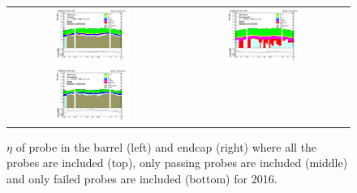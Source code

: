 \begin{figure}[htp]
  \begin{center}
    \begin{tabular}{cc}
      \includegraphics[width=0.45\textwidth]{figures/Zprime/2016/ScaleFactor/SameSign/nominal/stack_eta_BE_Barrel+Endcap_probes_PUW.png} &
      \includegraphics[width=0.45\textwidth]{figures/Zprime/2016/ScaleFactor/SameSign/nominal/stack_eta_BE_Barrel+Endcap_pass_PUW.png} \\
      \includegraphics[width=0.45\textwidth]{figures/Zprime/2016/ScaleFactor/SameSign/nominal/stack_eta_BE_Barrel+Endcap_fail_PUW.png} &
    \end{tabular}
    \caption{$\eta$ of probe in the barrel (left) and endcap (right) where all the probes are included (top), only passing probes are included (middle) and only failed probes are included (bottom) for 2016.}
    \label{fig:SS_nominal_eta_2016}
  \end{center}
\end{figure}
